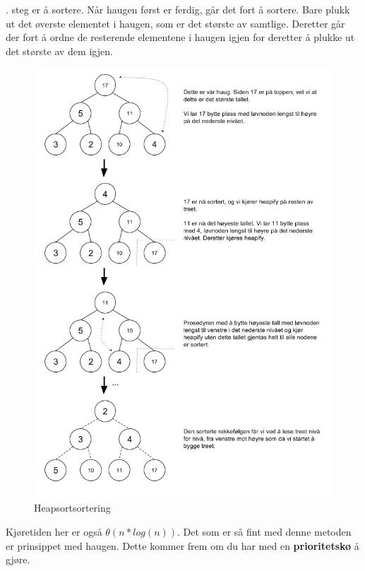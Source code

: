 . steg er å sortere. Når haugen først er ferdig, går det fort å sortere. Bare plukk ut det øverste elementet i haugen, som er det største av samtlige. Deretter går der fort å ordne de resterende elementene i haugen igjen for deretter å plukke ut det største av dem igjen.

\begin{figure}[H]
\includegraphics[scale=0.6]{images/heapsort2}
\centering %
\caption{Heapsortsortering}
\label{fig:heapsort2}
\end{figure}

\noindent Kjøretiden her er også \textbf{$\theta(n * log(n))$}. Det som er så fint med denne metoden er prinsippet med haugen. Dette kommer frem om du har med en \textbf{prioritetskø} å gjøre.

